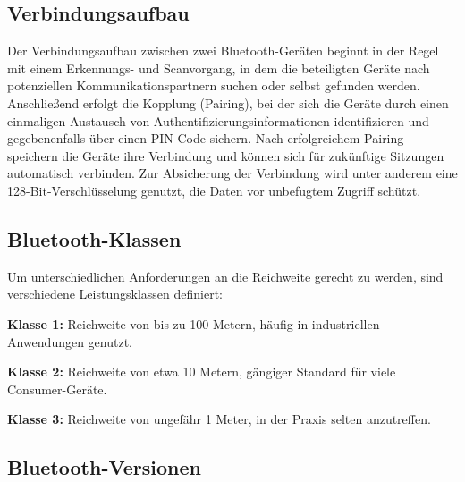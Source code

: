 \documentclass[a4paper, 12pt]{article} %
\begin{document}
\begin{spacing}{1.8}
\end{spacing}

\subsection{Verbindungsaufbau}

\begin{spacing}{1.8}  %
\fontsize{14pt}{15pt}\selectfont  %

Der Verbindungsaufbau zwischen zwei Bluetooth-Geräten beginnt in der Regel mit einem Erkennungs- und Scanvorgang, in dem die beteiligten Geräte nach potenziellen Kommunikationspartnern suchen oder selbst gefunden werden. Anschließend erfolgt die Kopplung (Pairing), bei der sich die Geräte durch einen einmaligen Austausch von Authentifizierungsinformationen identifizieren und gegebenenfalls über einen PIN-Code sichern. Nach erfolgreichem Pairing speichern die Geräte ihre Verbindung und können sich für zukünftige Sitzungen automatisch verbinden. Zur Absicherung der 
Verbindung wird unter anderem eine 128-Bit-Verschlüsselung genutzt, die Daten vor unbefugtem Zugriff schützt.

\end{spacing}

\subsection{Bluetooth-Klassen}

\begin{spacing}{1.8}  %
\fontsize{14pt}{15pt}\selectfont  %

Um unterschiedlichen Anforderungen an die Reichweite gerecht zu werden, sind verschiedene Leistungsklassen definiert:

\textbf{Klasse 1:} Reichweite von bis zu 100 Metern, häufig in industriellen Anwendungen genutzt.

\textbf{Klasse 2:} Reichweite von etwa 10 Metern, gängiger Standard für viele Consumer-Geräte.

\textbf{Klasse 3:} Reichweite von ungefähr 1 Meter, in der Praxis selten anzutreffen.

\end{spacing}

\subsection{Bluetooth-Versionen}
\end{document}
